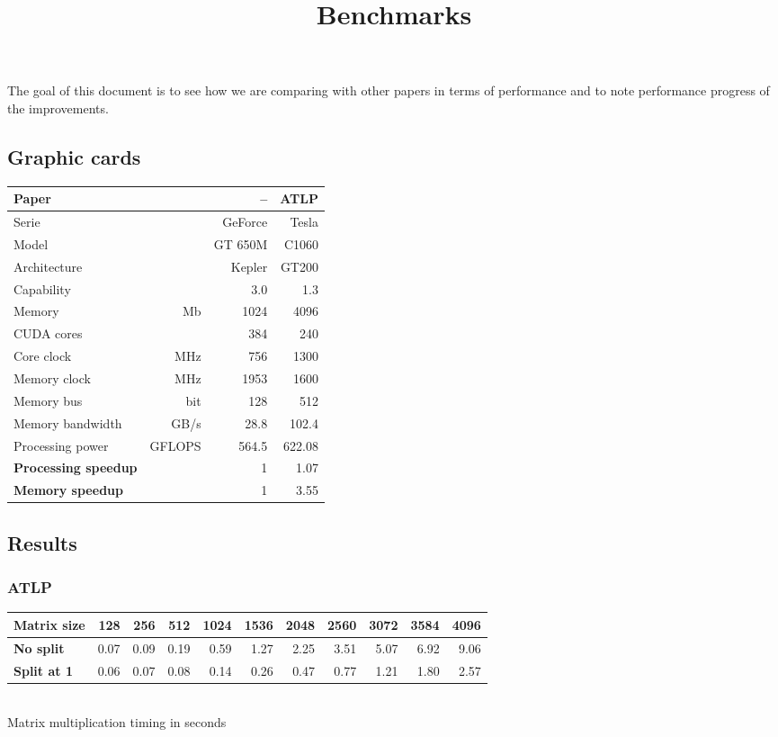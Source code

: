 

\title{Benchmarks}

\maketitle
\pagestyle{headings}

The goal of this document is to see how we are comparing with other papers in terms of performance and to note performance progress of the improvements.

\subsection*{Graphic cards}
\def\unt#1{& \footnotesize #1}
\begin{center}\begin{tabular}{lrrr} \toprule
\bf Paper		&				& \bf -- 		& \bf  ATLP\cite{gpu_atlp} \\ \midrule
Serie		&				& GeForce	& Tesla \\
Model		&				& GT 650M	& C1060 \\
Architecture	&				& Kepler		& GT200 \\
Capability		&				& 3.0		& 1.3 \\
Memory \unt{Mb}				& 1024		& 4096 \\
CUDA cores &					& 384		& 240 \\
Core clock \unt{MHz}			& 756		& 1300 \\
Memory clock \unt{MHz}			& 1953		& 1600 \\
Memory bus \unt{bit}				& 128		& 512 \\
Memory bandwidth \unt{GB/s}		& 28.8		& 102.4 \\
Processing power \unt{GFLOPS}	&564.5		& 622.08 \\ \midrule
\bf Processing speedup & 		& 1			& 1.07 \\
\bf Memory speedup & 			& 1			& 3.55 \\ \bottomrule
\end{tabular}\end{center}

\subsection*{Results}
\subsubsection*{ATLP\cite{gpu_atlp}}
\begin{center}\begin{tabular}{lrrrrrrrrrr} \toprule
\bf Matrix size & 128 & 256 & 512 & 1024 & 1536 & 2048 & 2560 & 3072 & 3584 & 4096 \\ \midrule
\bf No split & 0.07 & 0.09 & 0.19 & 0.59 & 1.27 & 2.25 & 3.51 & 5.07 & 6.92 & 9.06 \\
\bf Split at 1 & 0.06 & 0.07 & 0.08 & 0.14 & 0.26 & 0.47 & 0.77 & 1.21 & 1.80 & 2.57 \\ \bottomrule
\end{tabular} \\[4pt]
Matrix multiplication timing in seconds
\end{center}





